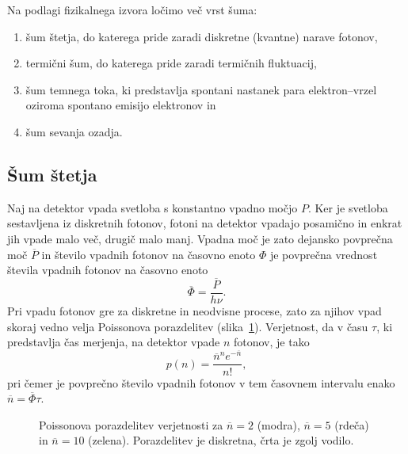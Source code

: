Na podlagi fizikalnega izvora ločimo več vrst šuma:
\begin{enumerate}
\item šum štetja, do katerega pride zaradi diskretne (kvantne) narave fotonov,
\item termični šum, do katerega pride zaradi termičnih fluktuacij,
\item šum temnega toka, ki predstavlja spontani nastanek para elektron--vrzel oziroma spontano
emisijo elektronov in
\item šum sevanja ozadja.
\end{enumerate}

\subsection*{Šum štetja} 
Naj na detektor vpada svetloba s konstantno vpadno 
močjo $P$. Ker je svetloba sestavljena iz diskretnih fotonov, fotoni na detektor vpadajo posamično 
in enkrat jih vpade malo več, 
drugič malo manj. Vpadna moč je zato dejansko povprečna moč $\overline{P}$ in število 
vpadnih fotonov na časovno enoto $\Phi$ je povprečna vrednost števila vpadnih fotonov na časovno enoto
\begin{equation}
\overline{\Phi} = \frac{\overline{P}}{h\nu}.
\end{equation}
Pri vpadu fotonov gre za diskretne in neodvisne procese, zato za njihov vpad skoraj vedno velja
Poissonova porazdelitev (slika~\ref{11_Poiss}). Verjetnost, da v času $\tau$, ki predstavlja 
čas merjenja, na detektor vpade $n$ fotonov, je tako 
\begin{equation}
p(n) = \frac{\overline{n}^n e^{-\overline{n}}}{n!},
\label{Poisson}
\end{equation}
pri čemer je povprečno število vpadnih fotonov v tem časovnem intervalu 
enako $\overline{n} = \overline{\Phi}\tau$.
\begin{figure}[h]
\centering
\def\svgwidth{90truemm} 

\caption{Poissonova porazdelitev verjetnosti za $\overline{n}=2$ (modra), 
$\overline{n}=5$ (rdeča) in $\overline{n}=10$ (zelena). Porazdelitev je 
diskretna, črta je zgolj vodilo.}
\label{11_Poiss}
\end{figure}


